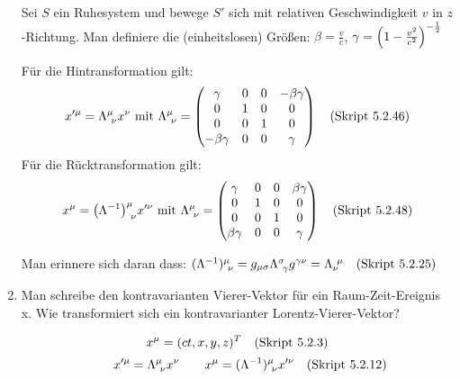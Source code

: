 \begin{enumerate}
    Sei $S$ ein Ruhesystem und bewege $S'$ sich mit relativen 
    Geschwindigkeit $v$ in $z$-Richtung. Man definiere die (einheitslosen)
    Größen:
    $\beta = \frac{v}{c}$, $\gamma=\qty(1-\frac{v^2}{c^2})^{-\frac{1}{2}}$
    
    Für die Hintransformation gilt:
    \begin{equation*}
      x'^\mu = \Lambda^\mu_{\ \nu} x^\nu 
      \text{ mit } 
      \Lambda^\mu_{\ \nu}=
      \begin{pmatrix}
        \gamma       & 0 & 0 & -\beta\gamma\\
        0            & 1 & 0 & 0           \\
        0            & 0 & 1 & 0           \\
        -\beta\gamma & 0 & 0 & \gamma      \\
      \end{pmatrix}
      \quad\text{(Skript 5.2.46)}
    \end{equation*}
    Für die Rücktransformation gilt:
    \begin{equation*}
      x^\mu = \qty(\Lambda^{-1})^\mu_{\ \nu} x'^\nu 
      \text{ mit } 
      \Lambda^\mu_{\ \nu}=
      \begin{pmatrix}
        \gamma       & 0 & 0 & \beta\gamma\\
        0            & 1 & 0 & 0           \\
        0            & 0 & 1 & 0           \\
        \beta\gamma  & 0 & 0 & \gamma      \\
      \end{pmatrix}
      \quad\text{(Skript 5.2.48)}
    \end{equation*}

    Man erinnere sich daran dass:
      $(\Lambda^{-1})^\mu_{\ \nu}
      =g_{\mu\sigma}\Lambda^{\sigma}_{\ \gamma}g^{\gamma\nu}
      =\Lambda_{\nu}^{\ \mu}
      \quad\text{(Skript 5.2.25)}$

    \item Man schreibe den kontravarianten Vierer-Vektor für ein
      Raum-Zeit-Ereignis x. Wie transformiert sich ein kontravarianter
      Lorentz-Vierer-Vektor?

      \begin{equation*}
        x^\mu =
        (ct, x, y, z)^T
        \quad\text{(Skript 5.2.3)}
      \end{equation*}
      \begin{equation*}
      \qquad x'^\mu = \Lambda^\mu_{\ \nu} x^\nu 
      \qquad x^\mu = (\Lambda^{-1})^\mu_{\ \nu} x'^\nu 
      \quad\text{(Skript 5.2.12)}
      \end{equation*}


\end{enumerate}
